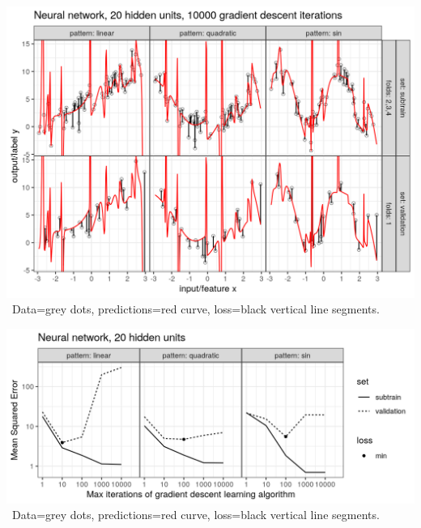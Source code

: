 \begin{frame}
  \includegraphics[width=\textwidth]{figure-overfitting-pred-units=20-maxit=10000.png}
\
Data=grey dots, predictions=red curve, loss=black vertical line segments.
\end{frame}


\begin{frame}
  \includegraphics[width=\textwidth]{figure-overfitting-data-loss-20.png}
\
Data=grey dots, predictions=red curve, loss=black vertical line segments.
\end{frame}

